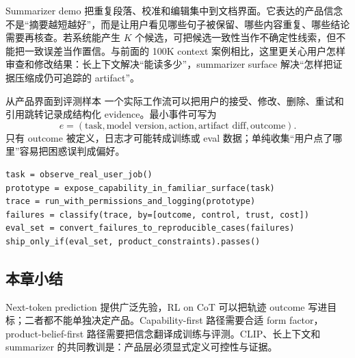 Summarizer demo 把重复段落、校准和编辑集中到文档界面。它表达的产品信念不是“摘要越短越好”，而是让用户看见哪些句子被保留、哪些内容重复、哪些结论需要再核查。若系统能产生 $K$ 个候选，可把候选一致性当作不确定性线索，但不能把一致误差当作置信。与前面的 100K context 案例相比，这里更关心用户怎样审查和修改结果：长上下文解决“能读多少”，summarizer surface 解决“怎样把证据压缩成仍可追踪的 artifact”。


\begin{knowledgebox}{从产品界面到评测样本}
一个实际工作流可以把用户的接受、修改、删除、重试和引用跳转记录成结构化 evidence。最小事件可写为
\[
e=(\text{task},\text{model version},\text{action},\text{artifact diff},\text{outcome}).
\]
只有 outcome 被定义，日志才可能转成训练或 eval 数据；单纯收集“用户点了哪里”容易把困惑误判成偏好。
\end{knowledgebox}

\begin{lstlisting}[caption={Capability-first 原型的最小验收循环}]
task = observe_real_user_job()
prototype = expose_capability_in_familiar_surface(task)
trace = run_with_permissions_and_logging(prototype)
failures = classify(trace, by=[outcome, control, trust, cost])
eval_set = convert_failures_to_reproducible_cases(failures)
ship_only_if(eval_set, product_constraints).passes()
\end{lstlisting}


\subsection{本章小结}

Next-token prediction 提供广泛先验，RL on CoT 可以把轨迹 outcome 写进目标；二者都不能单独决定产品。Capability-first 路径需要合适 form factor，product-belief-first 路径需要把信念翻译成训练与评测。CLIP、长上下文和 summarizer 的共同教训是：产品层必须显式定义可控性与证据。


